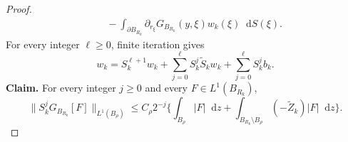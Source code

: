 \documentclass[10pt,a4paper]{amsart}
\newcommand{\dd}{\mathop{}\!\mathrm{d}}
\theoremstyle{plain}
\theoremstyle{remark}
\begin{document}
\begin{proof}
{\begin{equation}
\begin{aligned}
 &\quad-\int_{\partial B_{R_k}}\partial_{r_\xi}G_{B_{R_k}}(y,\xi)
                 w_k(\xi)\dd S(\xi).
 \end{aligned}
\end{equation}
}
For every integer $\ell\ge0$, finite iteration gives
{
\begin{equation}\label{eq:finite-green-iteration}
 w_k=S_k^{\ell+1}w_k
     +\sum_{j=0}^{\ell}S_k^j\widetilde S_kw_k
     +\sum_{j=0}^{\ell}S_k^jb_k.
\end{equation}
}
\textbf{Claim.}  For every integer $j\ge0$ and every
$F\in L^1(B_{R_k})$,
{
\begin{equation}\label{eq:iterated-green-estimate}
 \|S_k^jG_{B_{R_k}}[F]\|_{L^1(B_\rho)}
 \le C_\rho 2^{-j}\bigg\{
   \int_{B_\rho}|F|\dd z
   +\int_{B_{R_k}\setminus B_\rho}(-\widetilde Z_k)|F|\dd z\bigg\}.
\end{equation}
}


\end{proof}
\end{document}
